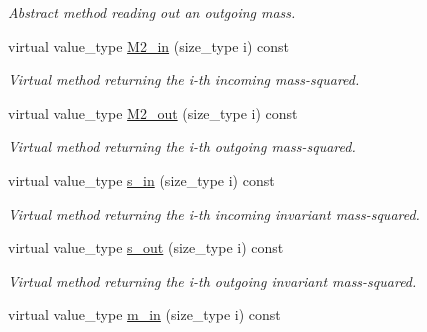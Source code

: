 \begin{DoxyCompactItemize}
\begin{DoxyCompactList}\small\item\em Abstract method reading out an outgoing mass. \end{DoxyCompactList}\item 
\hypertarget{a00451_a7c1f05fab4585edad53c722cf5fb52fc}{}virtual value\+\_\+type \hyperlink{a00451_a7c1f05fab4585edad53c722cf5fb52fc}{M2\+\_\+in} (size\+\_\+type i) const \label{a00451_a7c1f05fab4585edad53c722cf5fb52fc}

\begin{DoxyCompactList}\small\item\em Virtual method returning the i-\/th incoming mass-\/squared. \end{DoxyCompactList}\item 
\hypertarget{a00451_afa3f3694b5190c6c873d4da02302ecda}{}virtual value\+\_\+type \hyperlink{a00451_afa3f3694b5190c6c873d4da02302ecda}{M2\+\_\+out} (size\+\_\+type i) const \label{a00451_afa3f3694b5190c6c873d4da02302ecda}

\begin{DoxyCompactList}\small\item\em Virtual method returning the i-\/th outgoing mass-\/squared. \end{DoxyCompactList}\item 
\hypertarget{a00451_aeb270d6a68cd7d9157848609250c652c}{}virtual value\+\_\+type \hyperlink{a00451_aeb270d6a68cd7d9157848609250c652c}{s\+\_\+in} (size\+\_\+type i) const \label{a00451_aeb270d6a68cd7d9157848609250c652c}

\begin{DoxyCompactList}\small\item\em Virtual method returning the i-\/th incoming invariant mass-\/squared. \end{DoxyCompactList}\item 
\hypertarget{a00451_ade1e4b8ea51198e20b2c987c8865a649}{}virtual value\+\_\+type \hyperlink{a00451_ade1e4b8ea51198e20b2c987c8865a649}{s\+\_\+out} (size\+\_\+type i) const \label{a00451_ade1e4b8ea51198e20b2c987c8865a649}

\begin{DoxyCompactList}\small\item\em Virtual method returning the i-\/th outgoing invariant mass-\/squared. \end{DoxyCompactList}\item 
\hypertarget{a00451_a422a6b7a79690e7bae81713bd8eb3b15}{}virtual value\+\_\+type \hyperlink{a00451_a422a6b7a79690e7bae81713bd8eb3b15}{m\+\_\+in} (size\+\_\+type i) const \label{a00451_a422a6b7a79690e7bae81713bd8eb3b15}


\end{DoxyCompactItemize}
